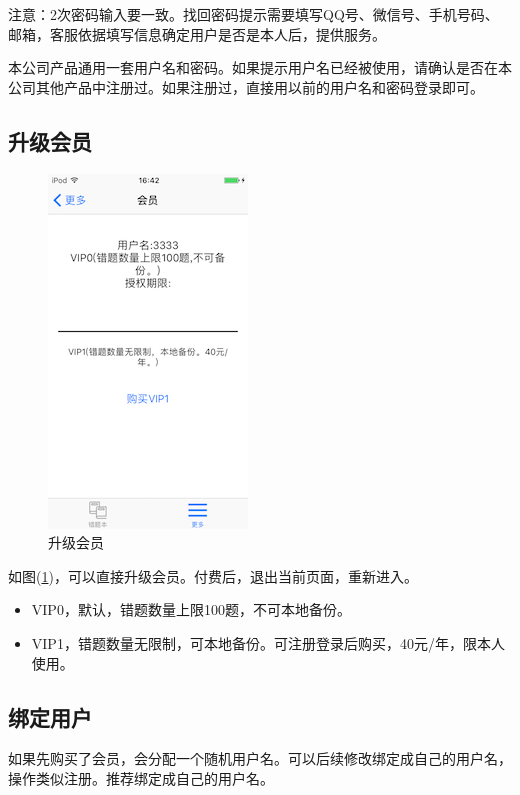 注意：2次密码输入要一致。找回密码提示需要填写QQ号、微信号、手机号码、邮箱，客服依据填写信息确定用户是否是本人后，提供服务。

本公司产品通用一套用户名和密码。如果提示用户名已经被使用，请确认是否在本公司其他产品中注册过。如果注册过，直接用以前的用户名和密码登录即可。

\subsection{升级会员}
\begin{figure}[H]
	\centering
	\includegraphics{img/29.png}
	\caption{升级会员}
	\label{img29}
\end{figure}
如图(\ref{img29})，可以直接升级会员。付费后，退出当前页面，重新进入。

\begin{itemize}
	\item VIP0，默认，错题数量上限100题，不可本地备份。
	\item VIP1，错题数量无限制，可本地备份。可注册登录后购买，40元/年，限本人使用。
\end{itemize}

\subsection{绑定用户}
如果先购买了会员，会分配一个随机用户名。可以后续修改绑定成自己的用户名，操作类似注册。推荐绑定成自己的用户名。


